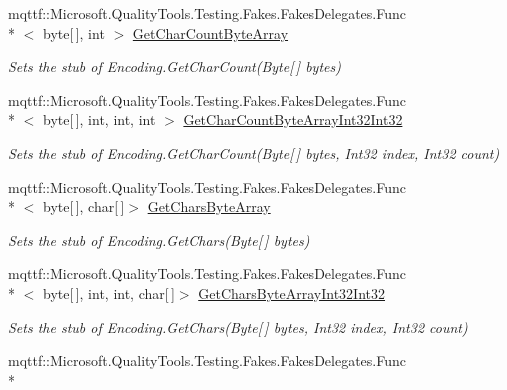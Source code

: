 \begin{DoxyCompactItemize}
mqttf\-::\-Microsoft.\-Quality\-Tools.\-Testing.\-Fakes.\-Fakes\-Delegates.\-Func\\*
$<$ byte\mbox{[}$\,$\mbox{]}, int $>$ \hyperlink{class_system_1_1_text_1_1_fakes_1_1_stub_encoding_a9e73b31ed6c6702889c288c35492f566}{Get\-Char\-Count\-Byte\-Array}
\begin{DoxyCompactList}\small\item\em Sets the stub of Encoding.\-Get\-Char\-Count(\-Byte\mbox{[}$\,$\mbox{]} bytes)\end{DoxyCompactList}\item 
mqttf\-::\-Microsoft.\-Quality\-Tools.\-Testing.\-Fakes.\-Fakes\-Delegates.\-Func\\*
$<$ byte\mbox{[}$\,$\mbox{]}, int, int, int $>$ \hyperlink{class_system_1_1_text_1_1_fakes_1_1_stub_encoding_a87cd93a095c0cad2b25a14dd9a23687e}{Get\-Char\-Count\-Byte\-Array\-Int32\-Int32}
\begin{DoxyCompactList}\small\item\em Sets the stub of Encoding.\-Get\-Char\-Count(\-Byte\mbox{[}$\,$\mbox{]} bytes, Int32 index, Int32 count)\end{DoxyCompactList}\item 
mqttf\-::\-Microsoft.\-Quality\-Tools.\-Testing.\-Fakes.\-Fakes\-Delegates.\-Func\\*
$<$ byte\mbox{[}$\,$\mbox{]}, char\mbox{[}$\,$\mbox{]}$>$ \hyperlink{class_system_1_1_text_1_1_fakes_1_1_stub_encoding_ab161ff0447340859036f2db950b17606}{Get\-Chars\-Byte\-Array}
\begin{DoxyCompactList}\small\item\em Sets the stub of Encoding.\-Get\-Chars(\-Byte\mbox{[}$\,$\mbox{]} bytes)\end{DoxyCompactList}\item 
mqttf\-::\-Microsoft.\-Quality\-Tools.\-Testing.\-Fakes.\-Fakes\-Delegates.\-Func\\*
$<$ byte\mbox{[}$\,$\mbox{]}, int, int, char\mbox{[}$\,$\mbox{]}$>$ \hyperlink{class_system_1_1_text_1_1_fakes_1_1_stub_encoding_aba99924f5b3fc1116e5346d30647978f}{Get\-Chars\-Byte\-Array\-Int32\-Int32}
\begin{DoxyCompactList}\small\item\em Sets the stub of Encoding.\-Get\-Chars(\-Byte\mbox{[}$\,$\mbox{]} bytes, Int32 index, Int32 count)\end{DoxyCompactList}\item 
mqttf\-::\-Microsoft.\-Quality\-Tools.\-Testing.\-Fakes.\-Fakes\-Delegates.\-Func\\*

\end{DoxyCompactItemize}
